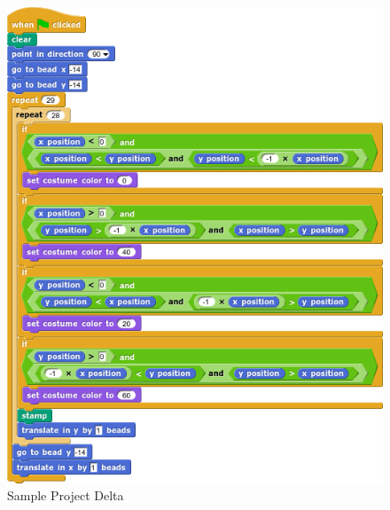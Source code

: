 \documentclass[]{article}
\begin{document}
\begin{figure}[h]
	\caption{Sample Project Delta}
	\label{delta}
	\centering
	\includegraphics[width=1.0\textwidth]{sample_csnap_applications/delta.png}
\end{figure}



\printbibliography
\end{document}
